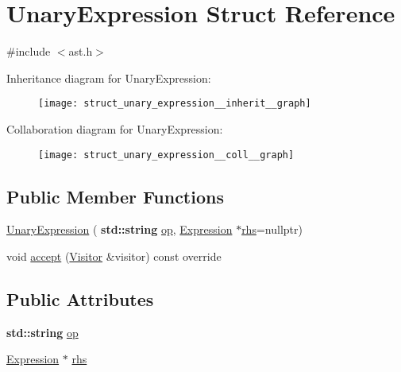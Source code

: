 \hypertarget{struct_unary_expression}{}\section{Unary\+Expression Struct Reference}
\label{struct_unary_expression}


{\ttfamily \#include $<$ast.\+h$>$}



Inheritance diagram for Unary\+Expression\+:\nopagebreak
\begin{figure}[H]
\begin{center}
\leavevmode
\texttt{[image: struct\_unary\_expression\_\_inherit\_\_graph]}
\end{center}
\end{figure}


Collaboration diagram for Unary\+Expression\+:\nopagebreak
\begin{figure}[H]
\begin{center}
\leavevmode
\texttt{[image: struct\_unary\_expression\_\_coll\_\_graph]}
\end{center}
\end{figure}
\subsection*{Public Member Functions}
\begin{DoxyCompactItemize}
\item 
\hyperlink{struct_unary_expression_a0a2158571198f271b43612707666e8fa}{Unary\+Expression} (\textbf{ std\+::string} \hyperlink{struct_unary_expression_a057cfd54844d5b36e15f16ee5272b071}{op}, \hyperlink{struct_expression}{Expression} $\ast$\hyperlink{struct_unary_expression_a53e53c6c0a0b76c46cb49a1fa48be5a5}{rhs}=nullptr)
\item 
void \hyperlink{struct_unary_expression_a88c89a0268ecfa5008b5afe7bc47913a}{accept} (\hyperlink{struct_visitor}{Visitor} \&visitor) const override
\end{DoxyCompactItemize}
\subsection*{Public Attributes}
\begin{DoxyCompactItemize}
\item 
\textbf{ std\+::string} \hyperlink{struct_unary_expression_a057cfd54844d5b36e15f16ee5272b071}{op}
\item 
\hyperlink{struct_expression}{Expression} $\ast$ \hyperlink{struct_unary_expression_a53e53c6c0a0b76c46cb49a1fa48be5a5}{rhs}
\end{DoxyCompactItemize}


